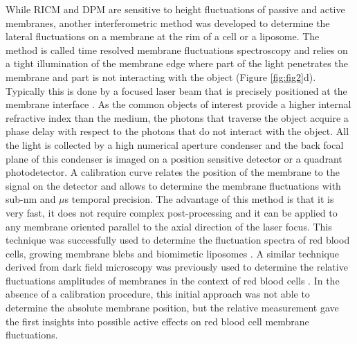 \documentclass[graybox]{svmult}
\begin{document}
While RICM and DPM are sensitive to height fluctuations of passive and active membranes, another interferometric method was developed to determine the lateral fluctuations on a membrane at the rim of a cell or a liposome. The method is called time resolved membrane fluctuations spectroscopy and relies on a tight illumination of the membrane edge where part of the light penetrates the membrane and part is not interacting with the object (Figure \ref{fig:fig2}d). Typically this is done by a focused laser beam that is precisely positioned at the membrane interface \cite{Betz:2009}. As the common objects of interest provide a higher internal refractive index than the medium, the photons that traverse the object acquire a phase delay with respect to the photons that do not interact with the object. All the light is collected by a high numerical aperture condenser and the back focal plane of this condenser is imaged on a position sensitive detector or a quadrant photodetector. A calibration curve relates the position of the membrane to the signal on the detector and allows to determine the membrane fluctuations with sub-nm and $\mu$s temporal precision. The advantage of this method is that it is very fast, it does not require complex post-processing and it can be applied to any membrane oriented parallel to the axial direction of the laser focus. This technique was successfully used to determine the fluctuation spectra of red blood cells, growing membrane blebs and biomimetic liposomes \cite{Betz:2009, Betz:2012, Peukes:2014}. A similar technique derived from dark field microscopy was previously used to determine the relative fluctuations amplitudes of membranes in the context of red blood cells \cite{Tuvia:1997}. In the absence of a calibration procedure, this initial approach was not able to determine the absolute membrane position, but the relative measurement gave the first insights into possible active effects on red blood cell membrane fluctuations.  
\end{document}

